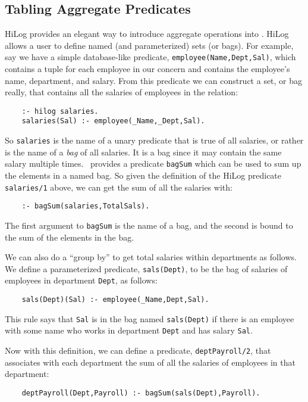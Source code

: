 \subsection{Tabling Aggregate Predicates}
 

HiLog provides an elegant way to introduce aggregate operations into
\ourprolog.  HiLog allows a user to define named (and parameterized)
sets (or bags).  For example, say we have a simple database-like predicate,
\verb|employee(Name,Dept,Sal)|, which contains a tuple for each
employee in our concern and contains the employee's name, department,
and salary.  From this predicate we can construct a set, or bag
really, that contains all the salaries of employees in the relation:
\begin{verbatim}
    :- hilog salaries.
    salaries(Sal) :- employee(_Name,_Dept,Sal).
\end{verbatim}
So \verb|salaries| is the name of a unary predicate that is true of
all salaries, or rather is the name of a {\em bag} of all salaries.
It is a bag since it may contain the same salary multiple times.
\ourprolog\ provides a predicate \verb|bagSum| which can be used to
sum up the elements in a named bag.  So given the definition of the
HiLog predicate \verb|salaries/1| above, we can get the sum of all the
salaries with:
\begin{verbatim}
    :- bagSum(salaries,TotalSals).
\end{verbatim}
The first argument to \verb|bagSum| is the name of a bag, and the
second is bound to the sum of the elements in the bag.

We can also do a ``group by'' to get total salaries within departments
as follows.  We define a parameterized predicate, \verb|sals(Dept)|,
to be the bag of salaries of employees in department \verb|Dept|, as
follows:
\begin{verbatim}
    sals(Dept)(Sal) :- employee(_Name,Dept,Sal).
\end{verbatim}
This rule says that \verb|Sal| is in the bag named \verb|sals(Dept)|
if there is an employee with some name who works in department
\verb|Dept| and has salary \verb|Sal|.

Now with this definition, we can define a predicate,
\verb|deptPayroll/2|, that associates with each department the sum of
all the salaries of employees in that department:
\begin{verbatim}
    deptPayroll(Dept,Payroll) :- bagSum(sals(Dept),Payroll).
\end{verbatim}

